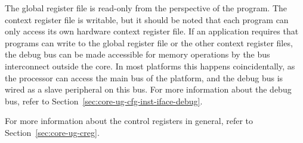 The global register file is read-only from the perspective of the program. The 
context register file is writable, but it should be noted that each program can 
only access its own hardware context register file. If an application requires 
that programs can write to the global register file or the other context 
register files, the debug bus can be made accessible for memory operations by 
the bus interconnect outside the core. In most platforms this happens 
coincidentally, as the processor can access the main bus of the platform, and 
the debug bus is wired as a slave peripheral on this bus. For more information
about the debug bus, refer to Section~\ref{sec:core-ug-cfg-inst-iface-debug}.
 
For more information about the control registers in general, refer to
Section~\ref{sec:core-ug-creg}.
